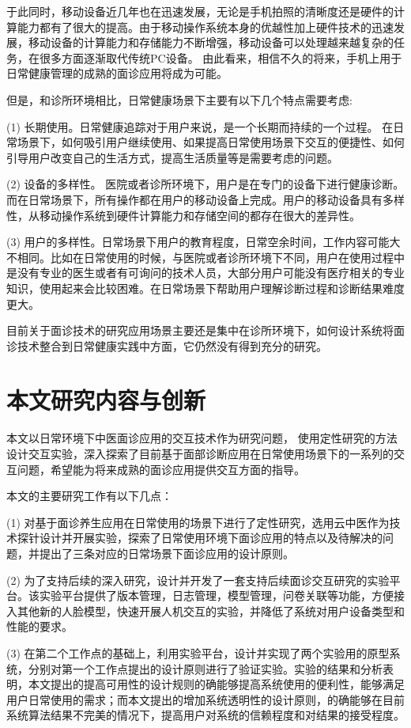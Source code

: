 于此同时，移动设备近几年也在迅速发展，无论是手机拍照的清晰度还是硬件的计算能力都有了很大的提高。由于移动操作系统本身的优越性加上硬件技术的迅速发展，移动设备的计算能力和存储能力不断增强，移动设备可以处理越来越复杂的任务，在很多方面逐渐取代传统PC设备。
由此看来，相信不久的将来，手机上用于日常健康管理的成熟的面诊应用将成为可能。

但是，和诊所环境相比，日常健康场景下主要有以下几个特点需要考虑: 

(1) 长期使用。日常健康追踪对于用户来说，是一个长期而持续的一个过程。 在日常场景下，如何吸引用户继续使用、如果提高日常使用场景下交互的便捷性、如何引导用户改变自己的生活方式，提高生活质量等是需要考虑的问题。

(2) 设备的多样性。 医院或者诊所环境下，用户是在专门的设备下进行健康诊断。而在日常场景下，所有操作都在用户的移动设备上完成。用户的移动设备具有多样性，从移动操作系统到硬件计算能力和存储空间的都存在很大的差异性。

(3) 用户的多样性。日常场景下用户的教育程度，日常空余时间，工作内容可能大不相同。比如在日常使用的时候，与医院或者诊所环境下不同，用户在使用过程中是没有专业的医生或者有可询问的技术人员，大部分用户可能没有医疗相关的专业知识，使用起来会比较困难。在日常场景下帮助用户理解诊断过程和诊断结果难度更大。

目前关于面诊技术的研究应用场景主要还是集中在诊所环境下，如何设计系统将面诊技术整合到日常健康实践中方面，它仍然没有得到充分的研究。



\section{本文研究内容与创新}

本文以日常环境下中医面诊应用的交互技术作为研究问题，
使用定性研究的方法设计交互实验，深入探索了目前基于面部诊断应用在日常使用场景下的一系列的交互问题，希望能为将来成熟的面诊应用提供交互方面的指导。

本文的主要研究工作有以下几点：

(1) 对基于面诊养生应用在日常使用的场景下进行了定性研究，选用云中医作为技术探针设计并开展实验，探索了日常使用环境下面诊应用的特点以及待解决的问题，并提出了三条对应的日常场景下面诊应用的设计原则。

(2) 为了支持后续的深入研究，设计并开发了一套支持后续面诊交互研究的实验平台。该实验平台提供了版本管理，日志管理，模型管理，问卷关联等功能，方便接入其他新的人脸模型，快速开展人机交互的实验，并降低了系统对用户设备类型和性能的要求。

(3) 在第二个工作点的基础上，利用实验平台，设计并实现了两个实验用的原型系统，分别对第一个工作点提出的设计原则进行了验证实验。实验的结果和分析表明，本文提出的提高可用性的设计规则的确能够提高系统使用的便利性，能够满足用户日常使用的需求；而本文提出的增加系统透明性的设计原则，的确能够在目前系统算法结果不完美的情况下，提高用户对系统的信赖程度和对结果的接受程度。


